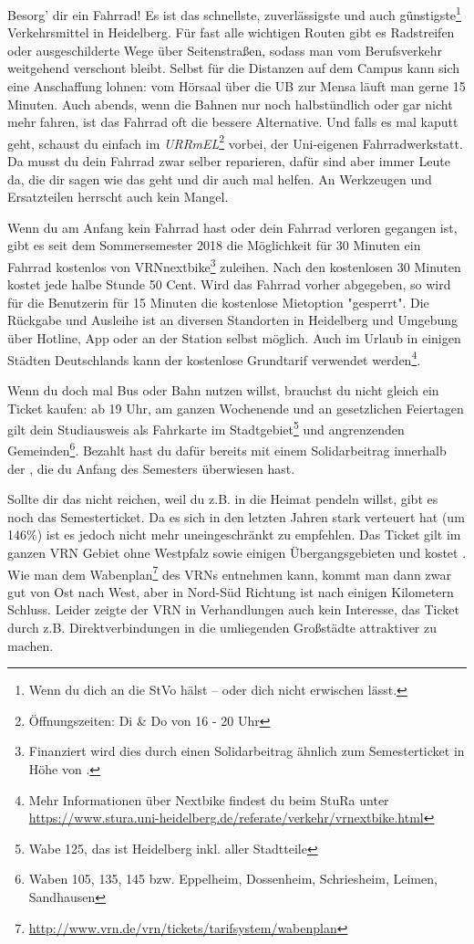 Besorg' dir ein Fahrrad! Es ist das schnellste, zuverlässigste und auch günstigste\footnote{Wenn du dich an die StVo hälst -- oder dich nicht erwischen lässt.} Verkehrsmittel in Heidelberg. Für fast alle wichtigen Routen gibt es Radstreifen oder ausgeschilderte Wege über Seitenstraßen, sodass man vom Berufsverkehr weitgehend verschont bleibt. Selbst für die Distanzen auf dem Campus kann sich eine Anschaffung lohnen: vom Hörsaal über die \gls{UB} zur Mensa läuft man gerne 15 Minuten. Auch abends, wenn die Bahnen nur noch halbstündlich oder gar nicht mehr fahren, ist das Fahrrad oft die bessere Alternative. Und falls es mal kaputt geht, schaust du einfach im \emph{URRmEL}\footnote{Öffnungszeiten: Di \& Do von 16 - 20 Uhr} vorbei, der Uni-eigenen Fahrradwerkstatt. Da musst du dein Fahrrad zwar selber reparieren, dafür sind aber immer Leute da, die dir sagen wie das geht und dir auch mal helfen. An Werkzeugen und Ersatzteilen herrscht auch kein Mangel.

\label{nextbike}
Wenn du am Anfang kein Fahrrad hast oder dein Fahrrad verloren gegangen ist, gibt es seit dem Sommersemester 2018 die Möglichkeit für 30 Minuten ein Fahrrad kostenlos von VRNnextbike\footnote{Finanziert wird dies durch einen Solidarbeitrag ähnlich zum Semesterticket in Höhe von .} zuleihen. Nach den kostenlosen 30 Minuten kostet jede halbe Stunde 50 Cent. Wird das Fahrrad vorher abgegeben, so wird für die Benutzerin für 15 Minuten die kostenlose Mietoption "gesperrt". Die Rückgabe und Ausleihe ist an diversen Standorten in Heidelberg und Umgebung über Hotline, App oder an der Station selbst möglich. Auch im Urlaub in einigen Städten Deutschlands kann der kostenlose Grundtarif verwendet werden\footnote{Mehr Informationen über Nextbike findest du beim StuRa unter \url{https://www.stura.uni-heidelberg.de/referate/verkehr/vrnextbike.html}}.

Wenn du doch mal Bus oder Bahn nutzen willst, brauchst du nicht gleich ein Ticket kaufen: ab 19 Uhr, am ganzen Wochenende und an gesetzlichen Feiertagen gilt dein Studiausweis als Fahrkarte im Stadtgebiet\footnote{Wabe 125, das ist Heidelberg inkl. aller Stadtteile} und angrenzenden Gemeinden\footnote{Waben 105, 135, 145 bzw. Eppelheim, Dossenheim, Schriesheim, Leimen, Sandhausen}. Bezahlt hast du dafür bereits mit einem Solidarbeitrag innerhalb der \EUR{\beitragssumme}, die du Anfang des Semesters überwiesen hast.

Sollte dir das nicht reichen, weil du z.B. in die Heimat pendeln willst, gibt es noch das Semesterticket. Da es sich in den letzten Jahren stark verteuert hat (um 146\%) ist es jedoch nicht mehr uneingeschränkt zu empfehlen. Das Ticket gilt im ganzen VRN Gebiet ohne Westpfalz sowie einigen Übergangsgebieten und kostet \EUR{\semesterticket}. Wie man dem Wabenplan\footnote{\url{http://www.vrn.de/vrn/tickets/tarifsystem/wabenplan}} des \glspl{VRN} entnehmen kann, kommt man dann zwar gut von Ost nach West, aber in Nord-Süd Richtung ist nach einigen Kilometern Schluss. Leider zeigte der \gls{VRN} in Verhandlungen auch kein Interesse, das Ticket durch z.B. Direktverbindungen in die umliegenden Großstädte attraktiver zu machen.

